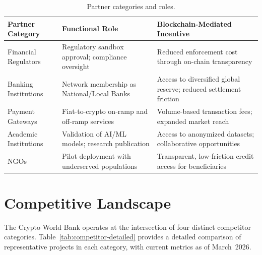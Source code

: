 \documentclass[12pt,a4paper]{report}
\newcommand{\tableheadfont}{\bfseries\small\color{PrimaryBlue}}
\newenvironment{moderntable}[1][H]{%
    \begin{table}[#1]\centering\small%
    \renewcommand{\arraystretch}{1.35}%
}{%
    \end{table}%
}
\begin{document}
\begin{moderntable}
\caption{Partner categories and roles.}
\begin{tabular}{@{} >{\raggedright}p{3.2cm} >{\raggedright}p{4.2cm} >{\raggedright\arraybackslash}p{4.6cm} @{}}
\toprule
\tableheadfont Partner Category & \tableheadfont Functional Role & \tableheadfont Blockchain-Mediated Incentive \\
\midrule
\rowcolor{RowShade}
Financial Regulators & Regulatory sandbox approval; compliance oversight & Reduced enforcement cost through on-chain transparency \\
Banking Institutions & Network membership as National/Local Banks & Access to diversified global reserve; reduced settlement friction \\
\rowcolor{RowShade}
Payment Gateways & Fiat-to-crypto on-ramp and off-ramp services & Volume-based transaction fees; expanded market reach \\
Academic Institutions & Validation of AI/ML models; research publication & Access to anonymized datasets; collaborative opportunities \\
\rowcolor{RowShade}
NGOs & Pilot deployment with underserved populations & Transparent, low-friction credit access for beneficiaries \\
\bottomrule
\end{tabular}
\end{moderntable}


\section{Competitive Landscape}

The Crypto World Bank operates at the intersection of four distinct competitor categories. Table~\ref{tab:competitor-detailed} provides a detailed comparison of representative projects in each category, with current metrics as of March~2026.
\end{document}
